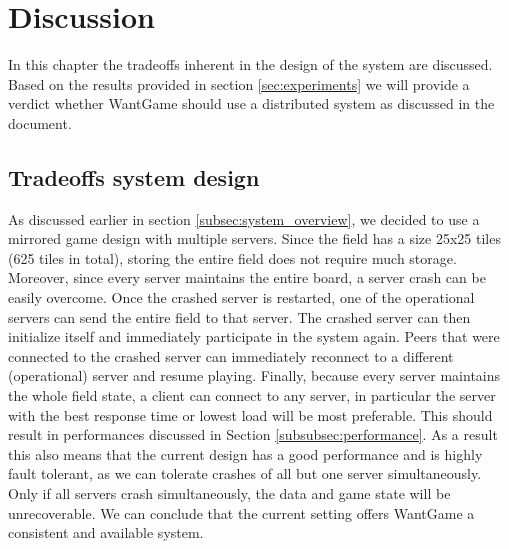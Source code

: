 \section{Discussion}


	In this chapter the tradeoffs inherent in the design of the system are discussed. Based on the results provided in section \ref{sec:experiments} we will provide a verdict whether WantGame should use a distributed system as discussed in the document.
	
	
	\subsection{Tradeoffs system design}
	\label{subsec:tradeoffs_system_design}
		As discussed earlier in section \ref{subsec:system_overview}, we decided to use a mirrored game design with multiple servers. 
		Since the field has a size 25x25 tiles (625 tiles in total), storing the entire field does not require much storage. 
		Moreover, since every server maintains the entire board, a server crash can be easily overcome.
		Once the crashed server is restarted, one of the operational servers can send the entire field to that server. 
		The crashed server can then initialize itself and immediately participate in the system again. 
		Peers that were connected to the crashed server can immediately reconnect to a different (operational) server and resume playing.
		Finally, because every server maintains the whole field state, a client can connect to any server, in particular the server with the best response time or lowest load will be most preferable.
		This should result in performances discussed in Section \ref{subsubsec:performance}.
		As a result this also means that the current design has a good performance and is highly fault tolerant, as we can tolerate crashes of all but one server simultaneously. 
		Only if all servers crash simultaneously, the data and game state will be unrecoverable.
		We can conclude that the current setting offers WantGame a consistent and available system. 
		

